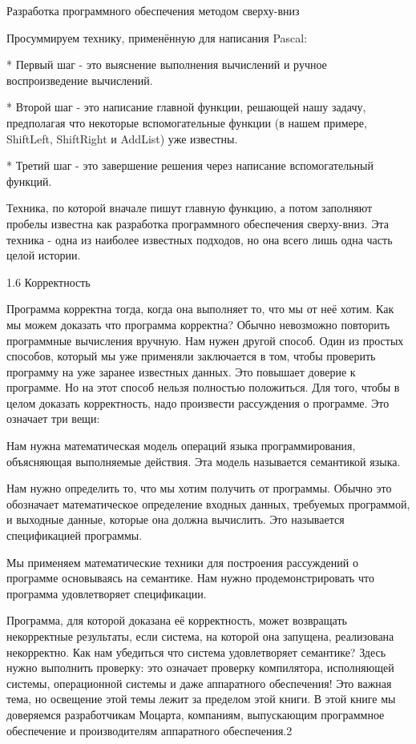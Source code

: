 Разработка программного обеспечения методом сверху-вниз

Просуммируем технику, применённую для написания Pascal:

* Первый шаг - это выяснение выполнения вычислений и ручное воспроизведение вычислений.

* Второй шаг - это написание главной функции, решающей нашу задачу, предполагая что некоторые вспомогательные функции (в нашем примере, ShiftLeft, ShiftRight и AddList) уже известны.

* Третий шаг - это завершение решения через написание вспомогательный функций.

Техника, по которой вначале пишут главную функцию, а потом заполняют пробелы известна как разработка программного обеспечения сверху-вниз. Эта техника - одна из наиболее известных подходов, но она всего лишь одна часть целой истории.

1.6 Корректность

Программа корректна тогда, когда она выполняет то, что мы от неё хотим. Как мы можем доказать что программа корректна? Обычно невозможно повторить программные вычисления вручную. Нам нужен другой способ. Один из простых способов, который мы уже применяли заключается в том, чтобы проверить программу на уже заранее известных данных. Это повышает доверие к программе. Но на этот способ нельзя полностью положиться. Для того, чтобы в целом доказать корректность, надо произвести рассуждения о программе. Это означает три вещи:

Нам нужна математическая модель операций языка программирования, объясняющая выполняемые действия. Эта модель называется семантикой языка.

Нам нужно определить то, что мы хотим получить от программы. Обычно это обозначает математическое определение входных данных, требуемых программой, и выходные данные, которые она должна вычислить. Это называется спецификацией программы.

Мы применяем математические техники для построения рассуждений о программе основываясь на семантике. Нам нужно продемонстрировать что программа удовлетворяет спецификации.

Программа, для которой доказана её корректность, может возвращать некорректные результаты, если система, на которой она запущена, реализована некорректно. Как нам убедиться что система удовлетворяет семантике? Здесь нужно выполнить проверку: это означает проверку компилятора, исполняющей системы, операционной системы и даже аппаратного обеспечения! Это важная тема, но освещение этой темы лежит за пределом этой книги. В этой книге мы доверяемся разработчикам Моцарта, компаниям, выпускающим программное обеспечение и производителям аппаратного обеспечения.2

